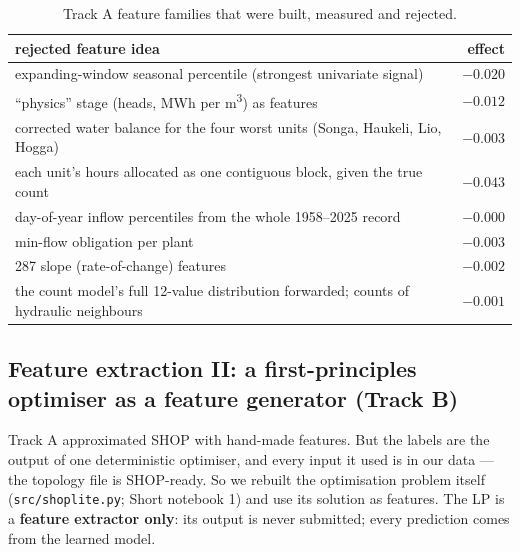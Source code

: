 \documentclass[11pt]{article}
\begin{document}
\begin{table}[H]
\centering\small
\begin{tabularx}{\linewidth}{Yr}
\toprule
rejected feature idea & effect \\
\midrule
expanding-window seasonal percentile (strongest univariate signal) & $-0.020$ \\
``physics'' stage (heads, MWh per m\textsuperscript{3}) as features & $-0.012$ \\
corrected water balance for the four worst units (Songa, Haukeli, Lio, Hogga) & $-0.003$ \\
each unit's hours allocated as one contiguous block, given the true count & $-0.043$ \\
day-of-year inflow percentiles from the whole 1958--2025 record & $-0.000$ \\
min-flow obligation per plant & $-0.003$ \\
287 slope (rate-of-change) features & $-0.002$ \\
the count model's full 12-value distribution forwarded; counts of hydraulic neighbours & $-0.001$ \\
\bottomrule
\end{tabularx}
\caption{Track A feature families that were built, measured and rejected.}
\label{tab:r-neg}
\end{table}

\subsection{Feature extraction II: a first-principles optimiser as a feature generator (Track B)}
\label{sec:fe-lp}

Track A approximated SHOP with hand-made features. But the labels are the output of one
deterministic optimiser, and every input it used is in our data --- the topology file is SHOP-ready.
So we rebuilt the optimisation problem itself (\texttt{src/shoplite.py}; Short notebook 1) and use
its solution as features. The LP is a \textbf{feature extractor only}: its output is never
submitted; every prediction comes from the learned model.
\end{document}
